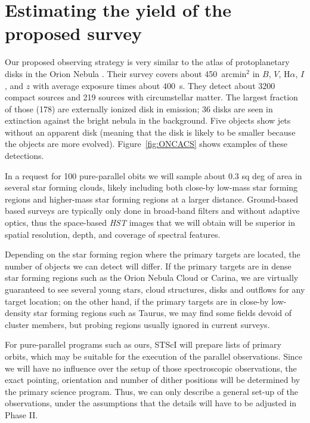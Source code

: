 \documentclass[12pt]{article}
\begin{document}
\section{Estimating the yield of the proposed survey}
Our proposed observing strategy is very similar to the atlas of protoplanetary disks in the Orion Nebula \citep{2008AJ....136.2136R,2013ApJS..207...10R}. Their survey covers about 450~arcmin$^2$ in $B$, $V$, H$\alpha$, $I$, and $z$ with average exposure times about 400~s. They detect about 3200 compact sources and 219 sources with circumstellar matter. The largest fraction of those (178) are externally ionized disk in emission; 36 disks are seen in extinction against the bright nebula in the background. Five objects show jets without an apparent disk (meaning that the disk is likely to be smaller because the objects are more evolved). Figure~\ref{fig:ONCACS} shows examples of these detections. 

In a request for 100 pure-parallel obits we will sample about 0.3 sq deg of
area in several star forming clouds, likely including both close-by low-mass
star forming regions and higher-mass star forming regions at a larger distance.
 Ground-based based surveys are typically only done in broad-band
filters \citep[IPHAS, which also includes an H$\alpha$ filter is an
  exception]{2005MNRAS.362..753D} and without adaptive optics, thus the
space-based \emph{HST} images that we will obtain will be superior in spatial
resolution, depth, and coverage of spectral features.


Depending on the star forming region where the primary targets are located, the
number of objects we can detect will differ. If the primary targets are in
dense star forming regions such as the Orion Nebula Cloud or Carina, we are
virtually guaranteed to see several young stars, cloud structures, disks and
outflows for any target location; on the other hand, if the primary targets are
in close-by low-density star forming regions such as Taurus, we may find some
fields devoid of cluster members, but probing regions usually ignored in current surveys. 





%
%
\describeobservations   %
For pure-parallel programs such as ours, STScI will prepare lists of primary orbits, which may be suitable for the execution of the parallel observations. Since we will have no influence over the setup of those spectroscopic observations, the exact pointing, orientation and number of dither positions will be determined by the primary science program. Thus, we can only describe a general set-up of the observations, under the assumptions that the details will have to be adjusted in Phase II.
\end{document}
